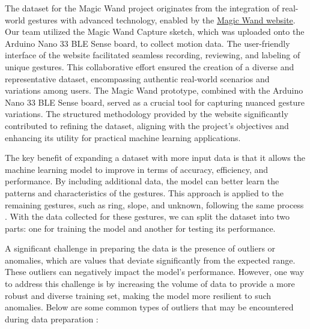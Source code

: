 \begin{enumerate}
	The dataset for the Magic Wand project originates from the integration of real-world gestures with advanced technology, enabled by the \href{https://tinyml.seas.harvard.edu/magic_wand/}{Magic Wand website}. Our team utilized the Magic Wand Capture sketch, which was uploaded onto the Arduino Nano 33 BLE Sense board, to collect motion data. The user-friendly interface of the website facilitated seamless recording, reviewing, and labeling of unique gestures. This collaborative effort ensured the creation of a diverse and representative dataset, encompassing authentic real-world scenarios and variations among users. The Magic Wand prototype, combined with the Arduino Nano 33 BLE Sense board, served as a crucial tool for capturing nuanced gesture variations. The structured methodology provided by the website significantly contributed to refining the dataset, aligning with the project's objectives and enhancing its utility for practical machine learning applications.
	
\end{enumerate}

The key benefit of expanding a dataset with more input data is that it allows the machine learning model to improve in terms of accuracy, efficiency, and performance. By including additional data, the model can better learn the patterns and characteristics of the gestures. This approach is applied to the remaining gestures, such as ring, slope, and unknown, following the same process \cite{Wings:2023}. With the data collected for these gestures, we can split the dataset into two parts: one for training the model and another for testing its performance.

A significant challenge in preparing the data is the presence of outliers or anomalies, which are values that deviate significantly from the expected range. These outliers can negatively impact the model's performance. However, one way to address this challenge is by increasing the volume of data to provide a more robust and diverse training set, making the model more resilient to such anomalies. Below are some common types of outliers that may be encountered during data preparation \cite{Munoz:2019}:

